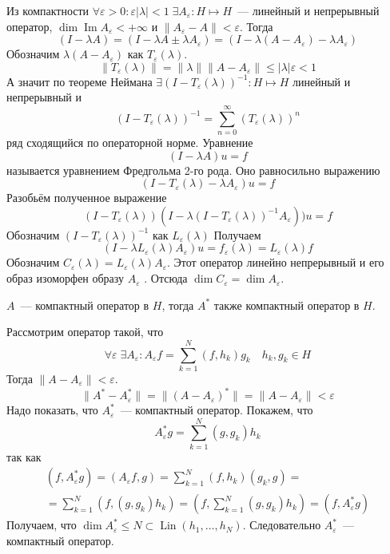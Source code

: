 \documentclass[12pt]{article}
\renewcommand{\Im}{\operatorname{Im}}
\DeclareMathOperator{\Lin}{Lin}
\begin{document}
Из компактности $\forall \varepsilon > 0\colon \varepsilon|\lambda| < 1\;
\exists A_\varepsilon : H \mapsto H$~--- линейный и непрерывный оператор,
$\dim \Im A_\varepsilon < + \infty$ и $\|A_\varepsilon - A \| < \varepsilon$.
Тогда
$$
(I - \lambda A) = (I - \lambda A \pm \lambda A_\varepsilon) = (I - 
\lambda(A - A_\varepsilon) - \lambda A_\varepsilon)
$$
Обозначим $\lambda(A - A_\varepsilon)$ как $T_\varepsilon(\lambda)$.
$$
\|T_\varepsilon(\lambda)\| = \|\lambda\|\|A - A_\varepsilon\| \le |\lambda|
\varepsilon < 1
$$
А значит по теореме Неймана $\exists (I - T_\varepsilon(\lambda))^{-1} : H 
\mapsto H$ линейный и непрерывный и
$$
(I - T_\varepsilon(\lambda))^{-1} = \sum\limits_{n = 0}^\infty(T_\varepsilon
(\lambda))^n
$$
ряд сходящийся по операторной норме.
Уравнение
$$
(I - \lambda A)u = f
$$
называется уравнением Фредгольма 2-го рода.
Оно равносильно выражению
$$
(I - T_\varepsilon(\lambda) - \lambda A_\varepsilon)u = f
$$
Разобьём полученное выражение
$$
(I - T_\varepsilon(\lambda))(I - \lambda(I - T_\varepsilon(\lambda))^{-1}
A_\varepsilon))u = f
$$
Обозначим $(I - T_\varepsilon(\lambda))^{-1}$ как $L_\varepsilon(\lambda)$
Получаем
$$
(I - \lambda L_\varepsilon(\lambda) A_\varepsilon)u = f_\varepsilon(\lambda)
= L_\varepsilon(\lambda) f
$$
Обозначим $C_\varepsilon(\lambda) = L_\varepsilon(\lambda)A_\varepsilon$.
Этот оператор линейно непрерывный и его образ изоморфен образу $A_\varepsilon$
.
Отсюда $\dim C_\varepsilon = \dim A_\varepsilon$.
\begin{Utv}
    $A$~--- компактный оператор в $H$, тогда $A^*$ также компактный оператор в
    $H$.
\end{Utv}
\begin{Proof}
    Рассмотрим оператор такой, что
    $$
    \forall \varepsilon\; \exists A_\varepsilon\colon 
    A_\varepsilon f = \sum\limits_{k = 1}^N(f, h_k)g_k\quad h_k,g_k \in H
    $$
    Тогда $\|A - A_\varepsilon\| < \varepsilon$.
    $$
    \|A^* - A_\varepsilon^*\| = \|(A - A_\varepsilon)^*\| = 
    \|A - A_\varepsilon\| < \varepsilon
    $$
    Надо показать, что $A_\varepsilon^*$~--- компактный оператор.
    Покажем, что
    $$
    A_\varepsilon^* g = \sum\limits_{k = 1}^N(g, g_k)h_k
    $$
    так как
    \begin{multline*}
    (f, A_\varepsilon^* g) = (A_\varepsilon f, g) = \sum\limits_{k = 1}^{N}
    (f, h_k)(g_k, g) =\\= \sum\limits_{k = 1}^N (f, (g, g_k)h_k) = (f, \sum
    \limits_{k = 1}^N(g, g_k)h_k) = (f, A_\varepsilon^* g)
    \end{multline*}
    Получаем, что $\dim A_\varepsilon^* \le N \subset \Lin(h_1,\dots, h_N)$.
    Следовательно $A_\varepsilon^*$~--- компактный оператор.
\end{Proof}
\end{document}
